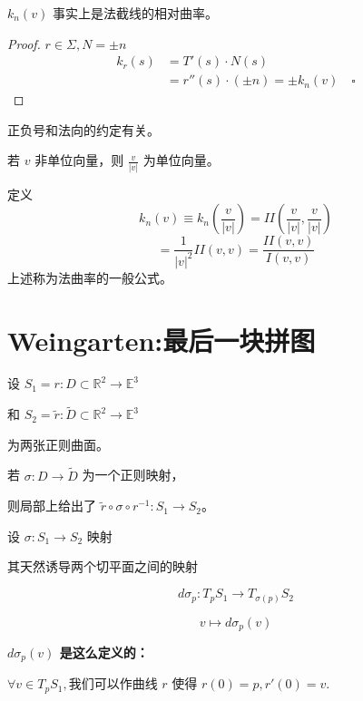 \documentclass[lang=cn,10pt,thmcnt=section]{elegantbook}
\begin{document}
\begin{proposition}
    $k_n(v)$ 事实上是法截线的相对曲率。
\end{proposition}
\begin{proof}
    $r \in \Sigma, N = \pm n$
\begin{align*}
k_r(s) &= T'(s) \cdot N(s) \\
       &= r''(s) \cdot ( \pm n ) = \pm k_n(v) \quad \square
\end{align*}

\end{proof}
\begin{remark}
    正负号和法向的约定有关。
\end{remark}

\begin{proposition}[法曲率的一般公式]


若 $v$ 非单位向量，则 $\frac{v}{|v|}$ 为单位向量。

定义
\[
k_n(v) \equiv k_n\left(\frac{v}{|v|}\right) = II\left(\frac{v}{|v|}, \frac{v}{|v|}\right)
\]
\[
= \frac{1}{|v|^2} II(v,v) = \frac{II(v,v)}{I(v,v)}
\]
上述称为法曲率的一般公式。
\end{proposition}

\section{Weingarten:最后一块拼图}
\begin{definition}[正则曲面间的映射]
    设 $S_1 = r : D \subset \mathbb{R}^2 \rightarrow \mathbb{E}^3$

和 $S_2 = \tilde{r} : \tilde{D} \subset \mathbb{R}^2 \rightarrow \mathbb{E}^3$

为两张正则曲面。

若 $\sigma : D \rightarrow \tilde{D}$ 为一个正则映射，

则局部上给出了 $\tilde{r} \circ \sigma \circ r^{-1} : S_1 \rightarrow S_2$。
\end{definition}
\begin{definition}[切映射]
    设 \( \sigma: S_1 \rightarrow S_2 \) 映射

其天然诱导两个切平面之间的映射

\[
d\sigma_p: T_pS_1 \rightarrow T_{\sigma(p)}S_2
\]

\[
v \mapsto d\sigma_p(v)
\]
\end{definition}
\textbf{$d\sigma_p(v)$ 是这么定义的：}

$\forall v \in T_pS_1, \text{我们可以作曲线 } r \text{ 使得 } r(0) = p, r'(0) = v.$
\end{document}
